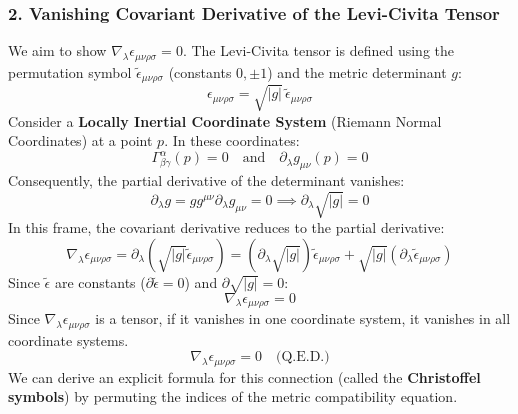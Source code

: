 \documentclass[11pt, a4paper]{report}
\begin{document}
\subsubsection*{2. Vanishing Covariant Derivative of the Levi-Civita Tensor}
We aim to show $\nabla_\lambda \epsilon_{\mu\nu\rho\sigma} = 0$.
The Levi-Civita tensor is defined using the permutation symbol $\tilde{\epsilon}_{\mu\nu\rho\sigma}$ (constants $0, \pm 1$) and the metric determinant $g$:
\begin{equation}
    \epsilon_{\mu\nu\rho\sigma} = \sqrt{|g|} \, \tilde{\epsilon}_{\mu\nu\rho\sigma}
\end{equation}
Consider a \textbf{Locally Inertial Coordinate System} (Riemann Normal Coordinates) at a point $p$. In these coordinates:
\begin{equation}
    \Gamma^\alpha_{\beta\gamma}(p) = 0 \quad \text{and} \quad \partial_\lambda g_{\mu\nu}(p) = 0
\end{equation}
Consequently, the partial derivative of the determinant vanishes:
\begin{equation}
    \partial_\lambda g = g g^{\mu\nu} \partial_\lambda g_{\mu\nu} = 0 \implies \partial_\lambda \sqrt{|g|} = 0
\end{equation}
In this frame, the covariant derivative reduces to the partial derivative:
\begin{equation}
    \nabla_\lambda \epsilon_{\mu\nu\rho\sigma} = \partial_\lambda (\sqrt{|g|} \tilde{\epsilon}_{\mu\nu\rho\sigma}) = (\partial_\lambda \sqrt{|g|}) \tilde{\epsilon}_{\mu\nu\rho\sigma} + \sqrt{|g|} (\partial_\lambda \tilde{\epsilon}_{\mu\nu\rho\sigma})
\end{equation}
Since $\tilde{\epsilon}$ are constants ($\partial \tilde{\epsilon} = 0$) and $\partial \sqrt{|g|} = 0$:
\begin{equation}
    \nabla_\lambda \epsilon_{\mu\nu\rho\sigma} = 0
\end{equation}
Since $\nabla_\lambda \epsilon_{\mu\nu\rho\sigma}$ is a tensor, if it vanishes in one coordinate system, it vanishes in all coordinate systems.
\begin{equation}
    \nabla_\lambda \epsilon_{\mu\nu\rho\sigma} = 0 \quad \text{(Q.E.D.)}
\end{equation}
\newline
We can derive an explicit formula for this connection (called the \textbf{Christoffel symbols}) by permuting the indices of the metric compatibility equation.
\end{document}
